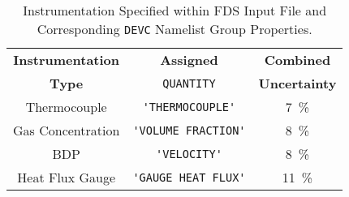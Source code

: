 \begin{table}[!ht]
\cprotect\caption{Instrumentation Specified within FDS Input File and Corresponding \verb|DEVC| Namelist Group Properties.}
\begin{center}
\begin{tabular}{ccc}
\toprule
\textbf{Instrumentation} & \textbf{Assigned}           & \textbf{Combined}       \\
\textbf{Type}                     & \verb|QUANTITY|             & \textbf{Uncertainty}        \\
\midrule
Thermocouple            & \verb|'THERMOCOUPLE'|       &     7~\%     \\
Gas Concentration       & \verb|'VOLUME FRACTION'|    &     8~\%     \\
BDP                     & \verb|'VELOCITY'|           &     8~\%     \\
Heat Flux Gauge         & \verb|'GAUGE HEAT FLUX'|    &     11~\%     \\
\bottomrule
\end{tabular}
\end{center}
\label{table:FDS_sensor_info}
\end{table}
\FloatBarrier

